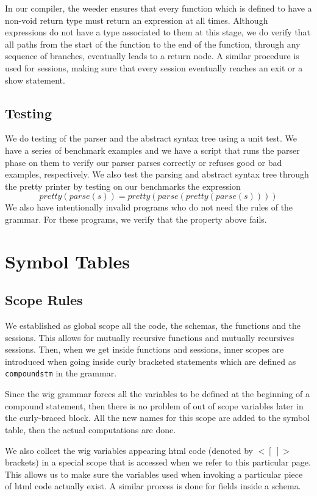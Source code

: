 \documentclass{WigReport}
\begin{document}
In our compiler, the weeder ensures that every function which is defined to have a non-void return type must return an expression at all times. Although expressions do not have a type associated to them at this stage, we do verify that all paths from the start of the function to the end of the function, through any sequence of branches, eventually leads to a return node. A similar procedure is used for sessions, making sure that every session eventually reaches an exit or a show statement.

\subsection{Testing}
We do testing of the parser and the abstract syntax tree using a unit test. We have a series of benchmark examples and we have a script that runs the parser phase on them to verify our parser parses correctly or refuses good or bad examples, respectively. We also test the parsing and abstract syntax tree through the pretty printer by testing on our benchmarks the expression 
$$pretty(parse(s))= pretty(parse(pretty(parse(s))))$$
We also have intentionally invalid programs who do not need the rules of the grammar. For these programs, we verify that the property above fails. 

\section{Symbol Tables}
\subsection{Scope Rules}
We established as global scope all the code, the schemas, the functions and the sessions. This allows for mutually recursive functions and mutually recursives sessions. Then, when we get inside functions and sessions, inner scopes are introduced when going inside curly bracketed statements which are defined as {\tt compoundstm} in the grammar.

Since the wig grammar forces all the variables to be defined at the beginning of a compound statement, then there is no problem of out of scope variables later in the curly-braced block. All the new names for this scope are added to the symbol table, then the actual computations are done. 

We also collcet the wig variables appearing html code (denoted by $<[\ ]>$ brackets) in a special scope that is accessed when we refer to this particular page. This allows us to make sure the variables used when invoking a particular piece of html code actually exist. A similar process is done for fields inside a schema.
\end{document}

